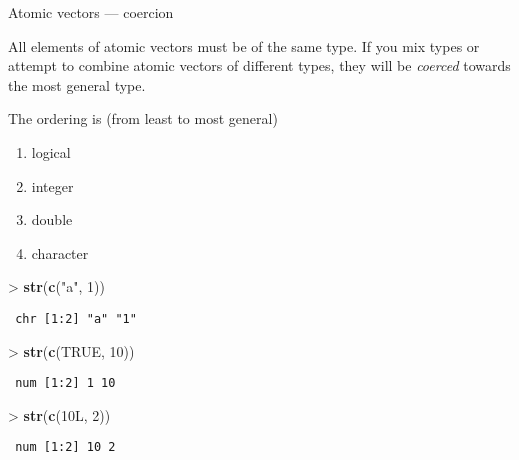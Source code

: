 \documentclass[10pt,ignorenonframetext,compress, aspectratio=169]{beamer}
\newenvironment{Shaded}{\begin{snugshade}}{\end{snugshade}}
\newcommand{\KeywordTok}[1]{\textcolor[rgb]{0.13,0.29,0.53}{\textbf{{#1}}}}
\newcommand{\DecValTok}[1]{\textcolor[rgb]{0.00,0.00,0.81}{{#1}}}
\newcommand{\StringTok}[1]{\textcolor[rgb]{0.31,0.60,0.02}{{#1}}}
\newcommand{\OtherTok}[1]{\textcolor[rgb]{0.56,0.35,0.01}{{#1}}}
\newcommand{\NormalTok}[1]{{#1}}
\providecommand{\tightlist}{%
  \setlength{\itemsep}{0pt}\setlength{\parskip}{0pt}}
\begin{document}
\begin{frame}[fragile]{Atomic vectors --- coercion}

All elements of atomic vectors must be of the same type. If you mix
types or attempt to combine atomic vectors of different types, they will
be \emph{coerced} towards the most general type.

The ordering is (from least to most general)

\begin{enumerate}
\def\labelenumi{\arabic{enumi}.}
\tightlist
\item
  logical
\item
  integer
\item
  double
\item
  character
\end{enumerate}

\begin{Shaded}
\begin{Highlighting}[]
\NormalTok{>}\StringTok{ }\KeywordTok{str}\NormalTok{(}\KeywordTok{c}\NormalTok{(}\StringTok{"a"}\NormalTok{, }\DecValTok{1}\NormalTok{))}
\end{Highlighting}
\end{Shaded}

\begin{verbatim}
 chr [1:2] "a" "1"
\end{verbatim}

\begin{Shaded}
\begin{Highlighting}[]
\NormalTok{>}\StringTok{ }\KeywordTok{str}\NormalTok{(}\KeywordTok{c}\NormalTok{(}\OtherTok{TRUE}\NormalTok{, }\DecValTok{10}\NormalTok{))}
\end{Highlighting}
\end{Shaded}

\begin{verbatim}
 num [1:2] 1 10
\end{verbatim}

\begin{Shaded}
\begin{Highlighting}[]
\NormalTok{>}\StringTok{ }\KeywordTok{str}\NormalTok{(}\KeywordTok{c}\NormalTok{(10L, }\DecValTok{2}\NormalTok{))}
\end{Highlighting}
\end{Shaded}

\begin{verbatim}
 num [1:2] 10 2
\end{verbatim}

\end{frame}
\end{document}
